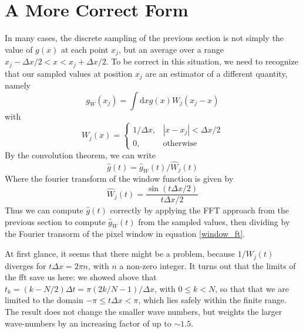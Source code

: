 \documentclass[12pt,preprint]{aastex}			%
\newcommand{\dd}{\mathrm{d}} %
\begin{document}
\section{A More Correct Form}
In many cases, the discrete sampling of the previous section is not simply
the value of $g(x)$ at each point $x_j$, but an average over a range 
$x_j-\Delta x/2 < x < x_j+\Delta x/2$.  To be correct in this situation, we
need to recognize that our sampled values at position $x_j$ are an estimator
of a different quantity, namely
\begin{equation}
  g_W(x_j) = \int \dd x g(x)W_j(x_j-x)
\end{equation}
with 
\begin{equation}
  W_j(x) = \left\{
\begin{array}{ll}
  1/\Delta x,& |x-x_j| < \Delta x/2 \\
  0,& \mathrm{otherwise}
\end{array}\right.
\end{equation}
By the convolution theorem, we can write
\begin{equation}
  \hat{g}(t) = \hat{g}_W(t) / \hat{W}_j(t)
\end{equation}
Where the fourier transform of the window function is given by
\begin{equation}
  \label{window_ft}
  \hat{W}_j(t) = \frac{\sin(t\Delta x/2)}{t\Delta x/2}
\end{equation}
Thus we can compute $\hat g(t)$ correctly by applying the FFT approach from the
previous section to compute $\hat g_W(t)$ from the sampled values, 
then dividing by the Fourier
transorm of the pixel window in equation \ref{window_ft}.

At first glance, it seems that there might be a problem, because $1/W_j(t)$
diverges for $t\Delta x = 2\pi n$, with $n$ a non-zero integer.  
It turns out that
the limits of the fft save us here: we showed above that 
$t_k = (k-N/2)\Delta t = \pi(2k/N-1)/\Delta x$, with $0\le k<N$, 
so that that we are limited to the domain $-\pi \le t\Delta x < \pi$,
which lies safely within the finite range.  The result does not change 
the smaller wave numbers, but weights the larger wave-numbers by 
an increasing factor of up to $\sim 1.5$.
\end{document}
